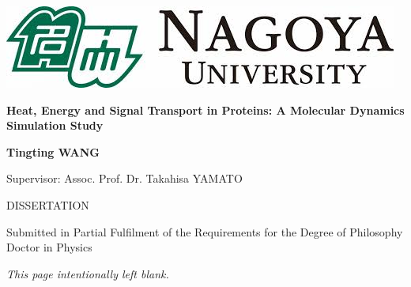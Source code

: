 \documentclass[12pt, oneside]{article}
\begin{document}
\graphicspath{ {figures/titlepage/} }
 
\thispagestyle{empty}
\begin{center}
\begin{minipage}{1\linewidth}
    \centering
    \includegraphics[width=0.6\linewidth]{images.jpeg}\par
    \vspace{1cm}
    {{\Huge \textbf {Heat, Energy and Signal Transport in Proteins: 
    A Molecular Dynamics Simulation Study}\par}}
    \vspace{2cm}
    {\Large \textbf {Tingting WANG}\par}
    \vspace{1cm}
    {\Large Supervisor: Assoc. Prof. Dr. Takahisa YAMATO \par}
    \vspace{1.5cm}
    {\Large DISSERTATION \par
    Submitted in Partial Fulfilment of the Requirements 
    for the Degree of 
    Philosophy Doctor in Physics\par}
    \vspace{1.5cm}
    {\Large  \linespread{1.5}{
    Computational Biophysics Laboratory (B-Lab) \par
    Graduate School of Science \par
    September 2023 \par}}
\end{minipage}
\end{center}
\clearpage

\newpage
\begin{center}
\textit{This page intentionally left blank.}
\end{center}
\thispagestyle{empty}\newpage
\end{document}
